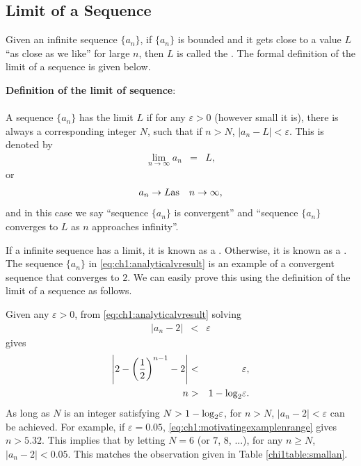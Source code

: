 \subsection{Limit of a Sequence} \label{ch1subsec:definationoflimitofsequence}

Given an infinite sequence $\{a_n\}$, if $\{a_n\}$ is bounded and it gets close to a value $L$ ``as close as we like'' for large $n$, then $L$ is called the . The formal definition of the limit of a sequence is given below.

\begin{VF}
\textbf{Definition of the limit of sequence}:
\\
\\
\noindent A sequence $\{a_n\}$ has the limit $L$ if for any $\varepsilon > 0$ (however small it is), there is always a corresponding integer $N$, such that if $n>N$, $|a_n-L|<\varepsilon$. This is denoted by
\begin{eqnarray}
  \lim_{n\rightarrow \infty} a_n &=& L, \nonumber
\end{eqnarray}
or
\begin{eqnarray}
  a_n \rightarrow L  & \textup{as} & n \rightarrow \infty, \nonumber
\end{eqnarray}
and in this case we say ``sequence $\{a_n\}$ is convergent'' and ``sequence $\{a_n\}$ converges to $L$ as $n$ approaches infinity''.
\end{VF}

If a infinite sequence has a limit, it is known as a . Otherwise, it is known as a . The sequence $\{a_n\}$ in \eqref{eq:ch1:analyticalvresult} is an example of a convergent sequence that converges to $2$. We can easily prove this using the definition of the limit of a sequence as follows.

Given any $\varepsilon > 0$, from \eqref{eq:ch1:analyticalvresult} solving
\begin{eqnarray}
  |a_n - 2| &<& \varepsilon \nonumber
\end{eqnarray}
gives
\begin{eqnarray}
  \left|2-\left(\frac{1}{2}\right)^{n-1}-2\right| &<& \varepsilon, \nonumber \\
  n &>& 1-\textup{log}_2\varepsilon. \label{eq:ch1:motivatingexamplenrange}
\end{eqnarray}
As long as $N$ is an integer satisfying $N > 1-\textup{log}_2\varepsilon$, for $n > N$, $|a_n - 2| < \varepsilon$ can be achieved. For example, if $\varepsilon = 0.05$, \eqref{eq:ch1:motivatingexamplenrange} gives $n>5.32$. This implies that by letting $N = 6$ (or $7$, $8$, ...), for any $n \geq N$, $|a_n-2|<0.05$. This matches the observation given in Table \ref{chi1table:smallan}.

